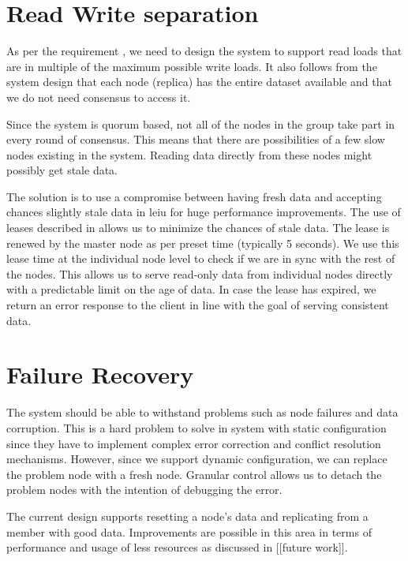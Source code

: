 \section{Read Write separation}

As per the requirement , we need to design the
system to support read loads that are in multiple of the maximum possible write
loads. It also follows from the system design that each node (replica) has the
entire dataset available and that we do not need consensus to access it. 

Since the system is quorum based, not all of the nodes in the group take part
in every round of consensus. This means that there are possibilities of a few 
slow nodes existing in the system. Reading data directly from these nodes might
possibly get stale data.

The solution is to use a compromise between having fresh data and accepting 
chances slightly stale data in leiu for huge performance improvements. The
use of leases described in  allows us to minimize the
chances of stale data. The lease is renewed by the master node as per preset 
time (typically 5 seconds). We use this lease time at the individual node level 
to check if we are in sync with the rest of the nodes. This allows us to serve 
read-only data from individual nodes directly with a predictable limit on the 
age of data. In case the lease has expired, we return an error response to
the client in line with the goal of serving consistent data.

\section{Failure Recovery}

The system should be able to withstand problems such as node failures and data
corruption. This is a hard problem to solve in system with static configuration
since they have to implement complex error correction and conflict resolution
mechanisms. However, since we support dynamic configuration, we can replace
the problem node with a fresh node. Granular control allows us to detach the
problem nodes with the intention of debugging the error.

The current design supports resetting a node's data and replicating from
a member with good data. Improvements are possible in this area in terms of
performance and usage of less resources as discussed in [[future work]].







